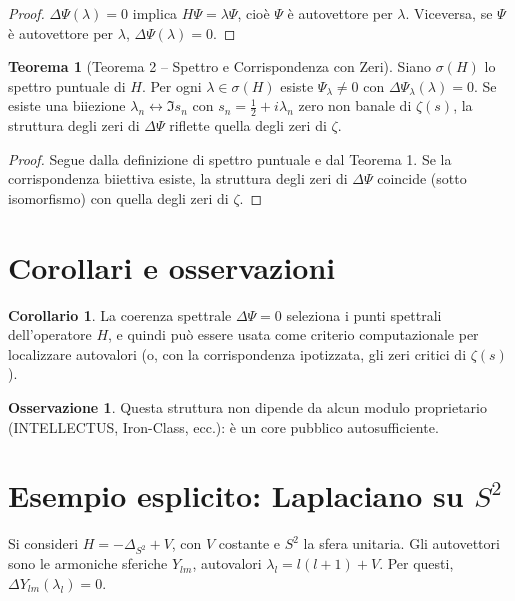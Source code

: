 \documentclass[12pt]{article}
\theoremstyle{definition}
\newtheorem{theorem}{Teorema}[section]
\newtheorem{corollary}{Corollario}[section]
\newtheorem{remark}{Osservazione}[section]
\begin{document}
\begin{proof}
$\Delta\Psi(\lambda) = 0$ implica $H\Psi = \lambda\Psi$, cioè $\Psi$ è autovettore per $\lambda$. Viceversa, se $\Psi$ è autovettore per $\lambda$, $\Delta\Psi(\lambda) = 0$.
\end{proof}

\begin{theorem}[Teorema 2 – Spettro e Corrispondenza con Zeri]
Siano $\sigma(H)$ lo spettro puntuale di $H$. Per ogni $\lambda\in\sigma(H)$ esiste $\Psi_\lambda\neq 0$ con $\Delta\Psi_\lambda(\lambda)=0$. Se esiste una biiezione $\lambda_n\leftrightarrow \Im s_n$ con $s_n=\frac{1}{2}+i\lambda_n$ zero non banale di $\zeta(s)$, la struttura degli zeri di $\Delta\Psi$ riflette quella degli zeri di $\zeta$.
\end{theorem}

\begin{proof}
Segue dalla definizione di spettro puntuale e dal Teorema 1. Se la corrispondenza biiettiva esiste, la struttura degli zeri di $\Delta\Psi$ coincide (sotto isomorfismo) con quella degli zeri di $\zeta$.
\end{proof}

\section{Corollari e osservazioni}

\begin{corollary}
La coerenza spettrale $\Delta\Psi=0$ seleziona i punti spettrali dell’operatore $H$, e quindi può essere usata come criterio computazionale per localizzare autovalori (o, con la corrispondenza ipotizzata, gli zeri critici di $\zeta(s)$).
\end{corollary}

\begin{remark}
Questa struttura non dipende da alcun modulo proprietario (INTELLECTUS, Iron-Class, ecc.): è un core pubblico autosufficiente.
\end{remark}

\section{Esempio esplicito: Laplaciano su $S^2$}

Si consideri $H = -\Delta_{S^2} + V$, con $V$ costante e $S^2$ la sfera unitaria. Gli autovettori sono le armoniche sferiche $Y_{lm}$, autovalori $\lambda_l = l(l+1) + V$. Per questi, $\Delta Y_{lm}(\lambda_l) = 0$.
\end{document}
